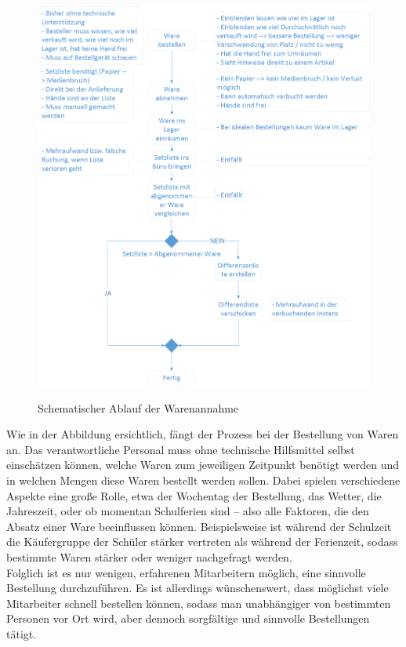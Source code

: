 \begin{figure}[H]
	\centering
	{\includegraphics[scale=0.53]{Bilder/Abbildungen/Warenannahme_Vergleich.png}}
	\caption{Schematischer Ablauf der Warenannahme}
	\label{fig:warenannahme_vergleich}
\end{figure}

Wie in der Abbildung ersichtlich, fängt der Prozess bei der Bestellung von Waren an. Das verantwortliche Personal muss ohne technische Hilfsmittel selbst einschätzen können, welche Waren zum jeweiligen Zeitpunkt benötigt werden und in welchen Mengen diese Waren bestellt werden sollen. Dabei spielen verschiedene Aspekte eine große Rolle, etwa der Wochentag der Bestellung, das Wetter, die Jahreszeit, oder ob momentan Schulferien sind -- also alle Faktoren, die den Absatz einer Ware beeinflussen können. Beispielsweise ist während der Schulzeit die Käufergruppe der Schüler stärker vertreten als während der Ferienzeit, sodass bestimmte Waren stärker oder weniger nachgefragt werden.\\
Folglich ist es nur wenigen, erfahrenen Mitarbeitern möglich, eine sinnvolle Bestellung durchzuführen. Es ist allerdings wünschenswert, dass möglichst viele Mitarbeiter schnell bestellen können, sodass man unabhängiger von bestimmten Personen vor Ort wird, aber dennoch sorgfältige und sinnvolle Bestellungen tätigt.\\

